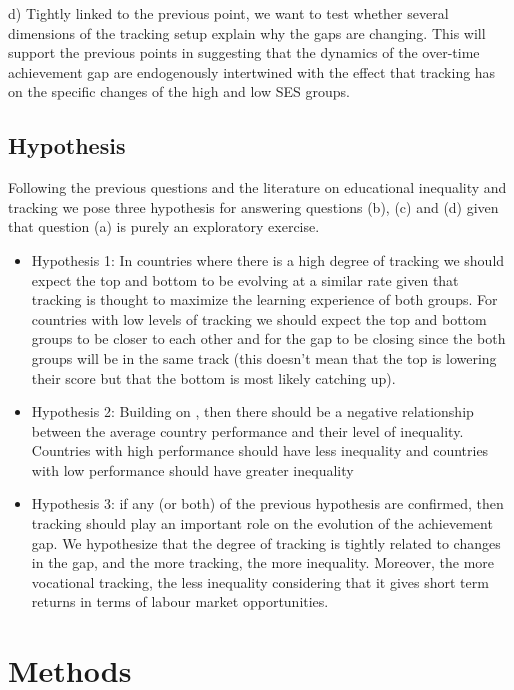\documentclass[11pt, a4paper]{article}\usepackage[]{graphicx}\usepackage[]{color}
\begin{document}
d) Tightly linked to the previous point, we want to test whether several dimensions of the tracking setup explain why the gaps are changing. This will support the previous points in suggesting that the dynamics of the over-time achievement gap are endogenously intertwined with the effect that tracking has on the specific changes of the high and low SES groups.

\subsection{Hypothesis}

Following the previous questions and the literature on educational inequality and tracking we pose three hypothesis for answering questions (b), (c) and (d) given that question (a) is purely an exploratory exercise.

\begin{itemize}
\item Hypothesis 1: In countries where there is a high degree of tracking we should expect the top and bottom to be evolving at a similar rate given that tracking is thought to maximize the learning experience of both groups. For countries with low levels of tracking we should expect the top and bottom groups to be closer to each other and for the gap to be closing since the both groups will be in the same track (this doesn't mean that the top is lowering their score but that the bottom is most likely catching up).

\item Hypothesis 2: Building on \citet{werfhorst_mijs}, then there should be a negative relationship between the average country performance and their level of inequality. Countries with high performance should have less inequality and countries with low performance should have greater inequality

\item Hypothesis 3: if any (or both) of the previous hypothesis are confirmed, then tracking should play an important role on the evolution of the achievement gap. We hypothesize that the degree of tracking is tightly related to changes in the gap, and the more tracking, the more inequality. Moreover, the more vocational tracking, the less inequality considering that it gives short term returns in terms of labour market opportunities.
\end{itemize}

\section{Methods}
\end{document}
